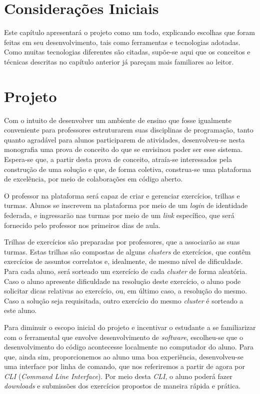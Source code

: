 \section{Considerações Iniciais}
Este capítulo apresentará o projeto como um todo, explicando escolhas que foram 
feitas em seu desenvolvimento, tais como ferramentas e tecnologias adotadas. 
Como muitas tecnologias diferentes são citadas, supõe-se 
aqui que os conceitos e técnicas descritas no capítulo anterior já pareçam 
mais familiares ao leitor.


\section{Projeto}
Com o intuito de desenvolver um ambiente de ensino que fosse igualmente conveniente 
para professores estruturarem suas disciplinas de programação, 
tanto quanto agradável para alunos participarem de atividades, desenvolveu-se nesta monografia
 uma prova de conceito do que se envisinou poder ser esse sistema. Espera-se que, a partir 
 desta prova de conceito, atraía-se interessados pela construção de uma solução e 
 que, de forma coletiva, construa-se uma plataforma de excelência,
 por meio de colaborações em código aberto.

O professor na plataforma será capaz de criar e gerenciar exercícios, trilhas e turmas. 
Alunos se inscrevem na plataforma por meio de um \emph{login} de identidade federada, e 
ingressarão nas turmas por meio de um \emph{link} específico, que será fornecido 
pelo professor nos primeiros dias de aula. 

Trilhas de exercícios são preparadas por professores, que a associarão as suas turmas. 
Estas trilhas são compostas de alguns \emph{clusters} de exercícios, que 
contêm exercícios de assuntos correlatos e, idealmente, de mesmo nível de dificuldade.
Para cada aluno, será sorteado um exercício de cada \emph{cluster} de forma aleatória. 
Caso o aluno apresente dificuldade na resolução deste exercício, o aluno pode solicitar 
dicas relativas ao exercício, ou, em último caso, a resolução do mesmo. Caso a solução 
seja requisitada, outro exercício do mesmo \emph{cluster} é sorteado a este aluno.

Para diminuir o escopo inicial do projeto e incentivar o estudante a se familiarizar com o ferramental 
que envolve desenvolvimento de \emph{software}, escolheu-se que o desenvolvimento do código 
acontecesse localmente no computador do aluno. Para que, ainda sim, proporcionemos ao aluno 
uma boa experiência, desenvolveu-se uma interface por linha de comando, que nos referiremos a partir de agora 
por \emph{CLI} (\emph{Command Line Interface}). Por meio desta \emph{CLI},
o aluno poderá fazer \emph{downloads} e submissões
dos exercícios propostos de maneira rápida e prática.

